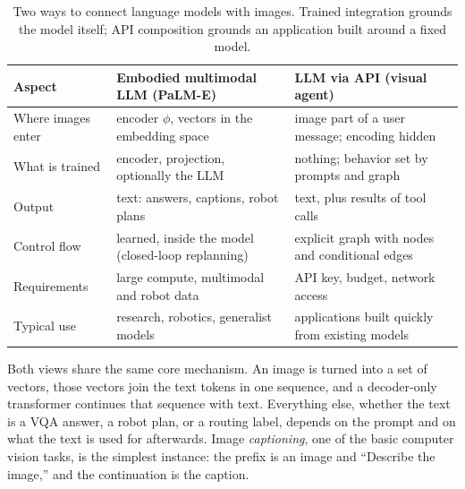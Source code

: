 \begin{table}[ht]
  \centering
  \begin{tabular}{@{}p{3.2cm}p{5.3cm}p{5.3cm}@{}}
    \toprule
    Aspect & Embodied multimodal LLM (PaLM-E) & LLM via API (visual agent) \\
    \midrule
    Where images enter & encoder $\phi$, vectors in the embedding space &
      image part of a user message; encoding hidden \\
    What is trained & encoder, projection, optionally the LLM & nothing;
      behavior set by prompts and graph \\
    Output & text: answers, captions, robot plans & text, plus results of
      tool calls \\
    Control flow & learned, inside the model (closed-loop replanning) &
      explicit graph with nodes and conditional edges \\
    Requirements & large compute, multimodal and robot data & API key,
      budget, network access \\
    Typical use & research, robotics, generalist models & applications
      built quickly from existing models \\
    \bottomrule
  \end{tabular}
  \caption{Two ways to connect language models with images. Trained
  integration grounds the model itself; API composition grounds an
  application built around a fixed model.}
  \label{tab:mllm-compare}
\end{table}

\noindent
Both views share the same core mechanism. An image is turned into a set of
vectors, those vectors join the text tokens in one sequence, and a
decoder-only transformer continues that sequence with text. Everything
else, whether the text is a VQA answer, a robot plan, or a routing label,
depends on the prompt and on what the text is used for afterwards. Image
\emph{captioning}, one of the basic computer vision tasks, is the simplest
instance: the prefix is an image and ``Describe the image,'' and the
continuation is the caption.
